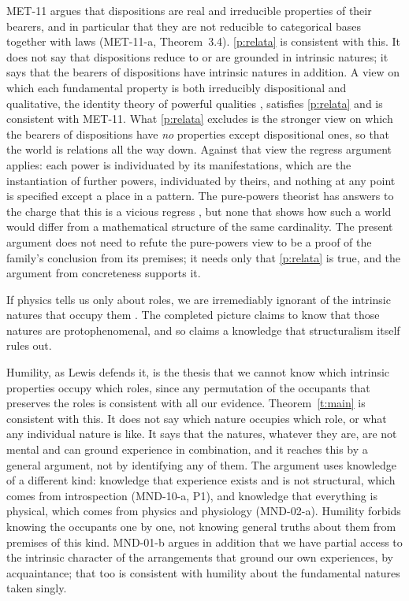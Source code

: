 \documentclass{situationist-preprint}
\begin{document}
\begin{reply}
MET-11 argues that dispositions are real and irreducible properties of their bearers, and in particular that they are not reducible to categorical bases together with laws (MET-11-a, Theorem~3.4). \ref{p:relata} is consistent with this. It does not say that dispositions reduce to or are grounded in intrinsic natures; it says that the bearers of dispositions have intrinsic natures in addition. A view on which each fundamental property is both irreducibly dispositional and qualitative, the identity theory of powerful qualities \citep{Heil2003}, satisfies \ref{p:relata} and is consistent with MET-11. What \ref{p:relata} excludes is the stronger view on which the bearers of dispositions have \emph{no} properties except dispositional ones, so that the world is relations all the way down. Against that view the regress argument applies: each power is individuated by its manifestations, which are the instantiation of further powers, individuated by theirs, and nothing at any point is specified except a place in a pattern. The pure-powers theorist has answers to the charge that this is a vicious regress \citep{Bird2007}, but none that shows how such a world would differ from a mathematical structure of the same cardinality. The present argument does not need to refute the pure-powers view to be a proof of the family's conclusion from its premises; it needs only that \ref{p:relata} is true, and the argument from concreteness supports it.
\end{reply}

\begin{objection}[Humility]\label{o:humility}
If physics tells us only about roles, we are irremediably ignorant of the intrinsic natures that occupy them \citep{Langton1998,Lewis2009}. The completed picture claims to know that those natures are protophenomenal, and so claims a knowledge that structuralism itself rules out.
\end{objection}

\begin{reply}
Humility, as Lewis defends it, is the thesis that we cannot know which intrinsic properties occupy which roles, since any permutation of the occupants that preserves the roles is consistent with all our evidence. Theorem~\ref{t:main} is consistent with this. It does not say which nature occupies which role, or what any individual nature is like. It says that the natures, whatever they are, are not mental and can ground experience in combination, and it reaches this by a general argument, not by identifying any of them. The argument uses knowledge of a different kind: knowledge that experience exists and is not structural, which comes from introspection (MND-10-a, P1), and knowledge that everything is physical, which comes from physics and physiology (MND-02-a). Humility forbids knowing the occupants one by one, not knowing general truths about them from premises of this kind. MND-01-b argues in addition that we have partial access to the intrinsic character of the arrangements that ground our own experiences, by acquaintance; that too is consistent with humility about the fundamental natures taken singly.
\end{reply}
\end{document}
